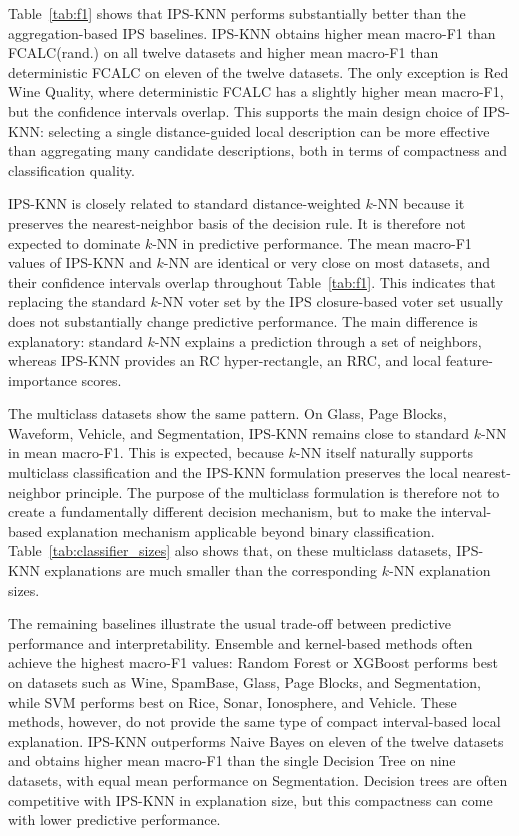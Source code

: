 \documentclass[a4paper,fleqn]{cas-sc}
\begin{document}
Table~\ref{tab:f1} shows that IPS-KNN performs substantially better than the aggregation-based IPS baselines. IPS-KNN obtains higher mean macro-F1 than FCALC(rand.) on all twelve datasets and higher mean macro-F1 than deterministic FCALC on eleven of the twelve datasets. The only exception is Red Wine Quality, where deterministic FCALC has a slightly higher mean macro-F1, but the confidence intervals overlap. This supports the main design choice of IPS-KNN: selecting a single distance-guided local description can be more effective than
aggregating many candidate descriptions, both in terms of compactness and classification quality.

IPS-KNN is closely related to standard distance-weighted \(k\)-NN because it preserves the nearest-neighbor basis of the decision rule. It is therefore not expected to dominate \(k\)-NN in predictive performance. The mean macro-F1 values of IPS-KNN and \(k\)-NN are identical or very close on most datasets, and their confidence intervals overlap throughout Table~\ref{tab:f1}. This indicates that replacing the standard \(k\)-NN voter set by the IPS closure-based voter set usually does not substantially change predictive performance. The main difference is explanatory: standard \(k\)-NN explains a prediction through a set of neighbors, whereas IPS-KNN provides an RC hyper-rectangle, an RRC, and local feature-importance scores.

The multiclass datasets show the same pattern. On Glass, Page Blocks, Waveform, Vehicle, and Segmentation, IPS-KNN remains close to standard \(k\)-NN in mean macro-F1. This is expected, because \(k\)-NN itself naturally supports multiclass classification and the IPS-KNN formulation preserves the local nearest-neighbor principle. The purpose of the multiclass formulation is therefore not to create a fundamentally different decision mechanism, but to make the interval-based explanation mechanism applicable beyond binary classification. Table~\ref{tab:classifier_sizes} also shows that, on these multiclass datasets, IPS-KNN explanations are much smaller than the corresponding \(k\)-NN explanation sizes.

The remaining baselines illustrate the usual trade-off between predictive performance and interpretability. Ensemble and kernel-based methods often achieve the highest macro-F1 values: Random Forest or XGBoost performs best on datasets such as Wine, SpamBase, Glass, Page Blocks, and Segmentation, while SVM performs best on Rice, Sonar, Ionosphere, and Vehicle. These methods, however, do not provide the same type of compact interval-based local explanation. IPS-KNN outperforms Naive Bayes on eleven of the twelve datasets and obtains higher mean macro-F1 than the single Decision Tree on nine datasets, with equal mean performance on Segmentation. Decision trees are often competitive with IPS-KNN in explanation size, but this compactness can come with lower predictive performance.
\end{document}
